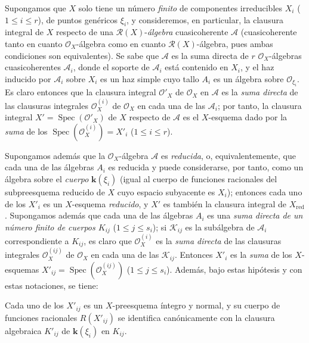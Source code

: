 \documentclass[oneside,10pt]{amsart}
\renewcommand{\leq}{\leqslant}
\newcommand{\oldpage}[2][]{\marginnote{\normalfont\footnotesize\textbf{#1}~|~#2}\ignorespaces}
\let\EGAOriginalLabel\label
\renewcommand{\label}[1]{\phantomsection\EGAOriginalLabel{#1}}
\begin{document}
\begin{env}[6.3.6]
\label{II.6.3.6-fr}
Supongamos que $X$ solo tiene un número \emph{finito} de componentes irreducibles $X_i$ ($1\leq i\leq r$), de puntos genéricos $\xi_i$, y consideremos, en particular, la clausura integral de $X$ respecto de una $\mathcal{R}(X)$-\emph{álgebra} cuasicoherente $\mathcal{A}$ (cuasicoherente tanto en cuanto $\mathcal{O}_X$-álgebra como en cuanto $\mathcal{R}(X)$-álgebra, pues ambas condiciones son equivalentes).
Se sabe  que $\mathcal{A}$ es la suma directa de $r$ $\mathcal{O}_X$-álgebras cuasicoherentes $\mathcal{A}_i$, donde el soporte de $\mathcal{A}_i$ está contenido en $X_i$, y el haz inducido por $\mathcal{A}_i$ sobre $X_i$ es un haz simple cuyo tallo $A_i$ es un álgebra sobre $\mathcal{O}_{\xi_i}$.
Es claro entonces  que la clausura integral $\mathcal{O}'_X$ de $\mathcal{O}_X$ en $\mathcal{A}$ es la \emph{suma directa} de las clausuras integrales $\mathcal{O}^{(i)}_X$ de $\mathcal{O}_X$ en cada una de las $\mathcal{A}_i$; por tanto, la clausura integral $X'=\operatorname{Spec}(\mathcal{O}'_X)$ de $X$ respecto de $\mathcal{A}$ es el $X$-esquema dado por la \emph{suma} de los $\operatorname{Spec}(\mathcal{O}^{(i)}_X)=X'_i$ ($1\leq i\leq r$).

Supongamos además que la $\mathcal{O}_X$-álgebra $\mathcal{A}$ es \emph{reducida}, o, equivalentemente, que cada una de las álgebras $A_i$ es reducida y puede considerarse, por tanto, como un álgebra sobre el \emph{cuerpo} $\boldsymbol{k}(\xi_i)$ (igual al cuerpo de funciones racionales del subpreesquema reducido de $X$ cuyo espacio subyacente es $X_i$);
entonces  cada uno de los $X'_i$ es un $X$-esquema \emph{reducido}, y $X'$ es también la clausura integral de $X_{\mathrm{red}}$.
Supongamos además que cada una de las álgebras $A_i$ es una \emph{suma directa de un número finito de cuerpos $K_{ij}$} ($1\leq j\leq s_i$);
si $\mathcal{K}_{ij}$ es la subálgebra de $\mathcal{A}_i$ correspondiente a $K_{ij}$, es claro que $\mathcal{O}^{(i)}_X$ es la \emph{suma directa} de las clausuras integrales $\mathcal{O}^{(ij)}_X$ de $\mathcal{O}_X$ en cada una de las $\mathcal{K}_{ij}$.
Entonces $X'_i$ es la \emph{suma} de los $X$-esquemas $X'_{ij}=\operatorname{Spec}(\mathcal{O}^{(ij)}_X)$ ($1\leq j\leq s_i$).
Además, bajo estas hipótesis y con estas notaciones, se tiene:
\end{env}

\oldpage[II]{119}
\begin{proposition}[6.3.7]
\label{II.6.3.7-fr}
Cada uno de los $X'_{ij}$ es un $X$-preesquema íntegro y normal, y su cuerpo de funciones racionales $R(X'_{ij})$ se identifica canónicamente con la clausura algebraica $K'_{ij}$ de $\boldsymbol{k}(\xi_i)$ en $K_{ij}$.
\end{proposition}
\end{document}
